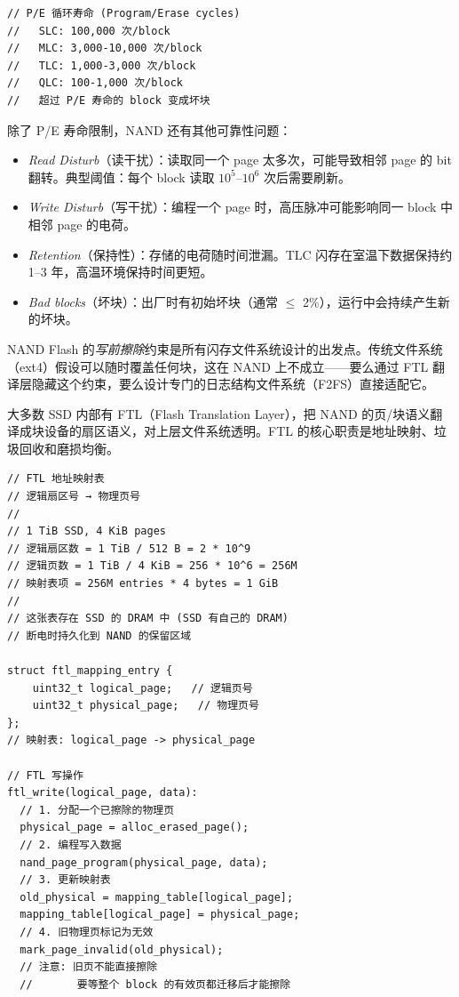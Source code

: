 \begin{filesystemlayout}
\begin{lstlisting}
// P/E 循环寿命 (Program/Erase cycles)
//   SLC: 100,000 次/block
//   MLC: 3,000-10,000 次/block
//   TLC: 1,000-3,000 次/block
//   QLC: 100-1,000 次/block
//   超过 P/E 寿命的 block 变成坏块
\end{lstlisting}

除了 P/E 寿命限制，NAND 还有其他可靠性问题：

\begin{itemize}
\tightlist
\item \emph{Read Disturb}（读干扰）：读取同一个 page 太多次，可能导致相邻 page 的 bit 翻转。典型阈值：每个 block 读取 $10^5$--$10^6$ 次后需要刷新。
\item \emph{Write Disturb}（写干扰）：编程一个 page 时，高压脉冲可能影响同一 block 中相邻 page 的电荷。
\item \emph{Retention}（保持性）：存储的电荷随时间泄漏。TLC 闪存在室温下数据保持约 1--3 年，高温环境保持时间更短。
\item \emph{Bad blocks}（坏块）：出厂时有初始坏块（通常 $\le$ 2\%），运行中会持续产生新的坏块。
\end{itemize}

\begin{warningbox}
NAND Flash 的\emph{写前擦除}约束是所有闪存文件系统设计的出发点。传统文件系统（ext4）假设可以随时覆盖任何块，这在 NAND 上不成立——要么通过 FTL 翻译层隐藏这个约束，要么设计专门的日志结构文件系统（F2FS）直接适配它。
\end{warningbox}


大多数 SSD 内部有 FTL（Flash Translation Layer），把 NAND 的页/块语义翻译成块设备的扇区语义，对上层文件系统透明。FTL 的核心职责是地址映射、垃圾回收和磨损均衡。

\begin{lstlisting}
// FTL 地址映射表
// 逻辑扇区号 → 物理页号
//
// 1 TiB SSD, 4 KiB pages
// 逻辑扇区数 = 1 TiB / 512 B = 2 * 10^9
// 逻辑页数 = 1 TiB / 4 KiB = 256 * 10^6 = 256M
// 映射表项 = 256M entries * 4 bytes = 1 GiB
//
// 这张表存在 SSD 的 DRAM 中 (SSD 有自己的 DRAM)
// 断电时持久化到 NAND 的保留区域

struct ftl_mapping_entry {
    uint32_t logical_page;   // 逻辑页号
    uint32_t physical_page;   // 物理页号
};
// 映射表: logical_page -> physical_page

// FTL 写操作
ftl_write(logical_page, data):
  // 1. 分配一个已擦除的物理页
  physical_page = alloc_erased_page();
  // 2. 编程写入数据
  nand_page_program(physical_page, data);
  // 3. 更新映射表
  old_physical = mapping_table[logical_page];
  mapping_table[logical_page] = physical_page;
  // 4. 旧物理页标记为无效
  mark_page_invalid(old_physical);
  // 注意: 旧页不能直接擦除
  //       要等整个 block 的有效页都迁移后才能擦除
\end{lstlisting}


\end{filesystemlayout}
